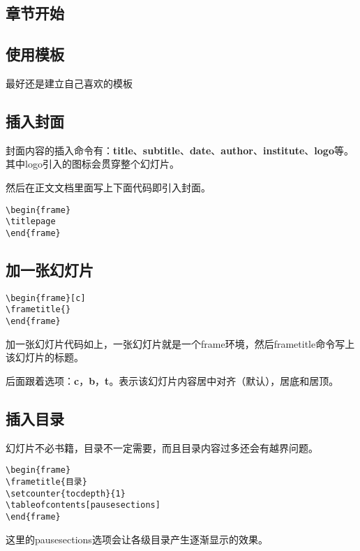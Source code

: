 \documentclass[11pt,oneside]{book}
\begin{document}
\begin{common-format}
\mainmatter

\chapter{章节开始}

\section{使用模板}
最好还是建立自己喜欢的模板

\section{插入封面}
封面内容的插入命令有：\textbf{title}、\textbf{subtitle}、\textbf{date}、\textbf{author}、\textbf{institute}、\textbf{logo}等。其中logo引入的图标会贯穿整个幻灯片。

然后在正文文档里面写上下面代码即引入封面。
\begin{Verbatim}
\begin{frame}
\titlepage
\end{frame}
\end{Verbatim}

\section{加一张幻灯片}
\begin{Verbatim}
\begin{frame}[c]
\frametitle{}
\end{frame}
\end{Verbatim}
加一张幻灯片代码如上，一张幻灯片就是一个frame环境，然后frametitle命令写上该幻灯片的标题。

后面跟着选项：\textbf{c}，\textbf{b}，\textbf{t}。表示该幻灯片内容居中对齐（默认），居底和居顶。

\section{插入目录}
幻灯片不必书籍，目录不一定需要，而且目录内容过多还会有越界问题。
\begin{Verbatim}
\begin{frame}
\frametitle{目录}
\setcounter{tocdepth}{1}
\tableofcontents[pausesections]
\end{frame}
\end{Verbatim}
这里的pausesections选项会让各级目录产生逐渐显示的效果。



\end{common-format}
\end{document}
